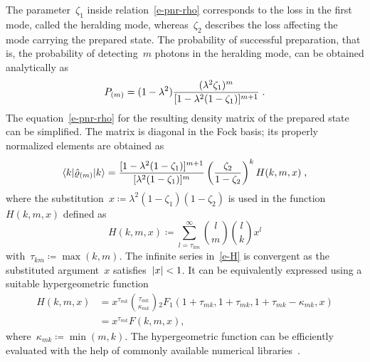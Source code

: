 \documentclass{article}
\begin{document}
The parameter~$\zeta_{1}$ inside relation~\eqref{e-pnr-rho} corresponds to the loss in the first mode, called the heralding mode, whereas~$\zeta_{2}$ describes the loss affecting the mode carrying the prepared state. The probability of successful preparation, that is, the probability of detecting~$m$ photons in the heralding mode, can be obtained analytically as
%
\begin{equation}\label{e-pnr-pro}
  P_{(m)} = (1 - \lambda^{2}) 
  \frac
    { (\lambda^{2} \zeta_{1})^{m} }
    { [ 1 - \lambda^{2} (1 - \zeta_{1}) ]^{m + 1} } \;\text{.}
\end{equation}
%
The equation~\eqref{e-pnr-rho} for the resulting density matrix of the prepared state can be simplified. The matrix is diagonal in the Fock basis; its properly normalized elements are obtained as
%
\begin{equation}\label{e-pnr-rho-kk}
  \braket{ k | \hat{\varrho}_{(m)} | k } =
  \frac
    { [ 1 - \lambda^{2} (1 - \zeta_{1}) ]^{m + 1} }
    { [ \lambda^{2} (1 - \zeta_{1}) ]^{m} }
  \left( \frac{ \zeta_{2} }{ 1 - \zeta_{2} } \right)^{k}
  H (k, m, x) \;\text{,}
\end{equation}
%
where the substitution~${x \coloneqq \lambda^{2} ( 1 - \zeta_{1} )(1 - \zeta_{2} )}$ is used in the function~$H(k, m, x)$ defined as
%
\begin{equation}\label{e-H}
  H(k, m, x) \coloneq
  \sum\limits_{l = \tau_{km}}^{\infty}
    \binom{l}{m}
    \binom{l}{k}
    x^{l} 
\end{equation}
%
with~${\tau_{km} \coloneqq \max(k, m)}$. The infinite series in~\eqref{e-H} is convergent as the substituted argument~$x$ satisfies~${\lvert x \rvert < 1}$. It can be equivalently expressed using a suitable hypergeometric function~\cite{bateman1981}
%
\begin{equation}
  \begin{aligned}
    H(k, m, x) & =
    x^{\tau_{mk}} 
    \binom
      {\tau_{mk}}
      {\kappa_{mk}}
    {}_{2}F_{1} (
      1 + \tau_{mk},
      1 + \tau_{mk},
      1 + \tau_{mk} - \kappa_{mk},
      x
    ) \\
    & =
    x^{\tau_{mk}} F(k, m, x),
  \end{aligned}
\end{equation}
%
where~${\kappa_{mk} \coloneqq \min (m, k)}$. The hypergeometric function can be efficiently evaluated with the help of commonly available numerical libraries~\cite{virtanen2020}. 
\end{document}

